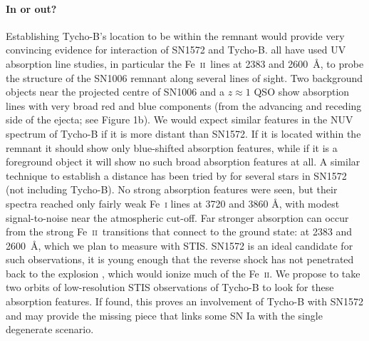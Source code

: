 \documentclass[12pt]{article}
\newcommand{\feii}{Fe~\textsc{ii}}
\begin{document}
\paragraph{In or out?}
Establishing Tycho-B's location to be within the remnant would provide very convincing evidence for interaction of SN1572 and Tycho-B. 
\cite{1988ApJ...327..164F,1993ApJ...416..247W, 2005ApJ...624..189W} all have used UV absorption line studies, in particular the \feii\ lines at 2383 and 2600~\AA, to probe the structure of the SN1006 remnant along several lines of sight. Two background objects near the projected centre of SN1006 \citep[an OB subdwarf; ][]{1980ApJ...241.1039S} and a $z \approx 1$ QSO show absorption lines with very broad red and blue components (from the advancing and receding side of the ejecta; see Figure 1b).  We would expect similar features in the NUV spectrum of Tycho-B if it is more distant than SN1572.   If it is located  within the remnant it should  show only blue-shifted absorption features, while if it is a foreground object it will show no such broad absorption features at all. A similar technique to establish a distance has been tried by \citet{2007PASJ...59..811I} for  several stars in SN1572 (not including Tycho-B).  No strong absorption features were seen, but their spectra reached only fairly weak Fe~\textsc{i} lines at 3720 and 3860 \AA, with modest signal-to-noise near the atmospheric cut-off.
Far stronger absorption can occur  from the strong \feii\ transitions that connect to the ground state: at 2383 and 2600~\AA, which we plan to measure with STIS. SN1572 is an ideal candidate for such observations, it is young enough that the reverse shock has not penetrated back to the explosion \citep[current radius 183\arcsec;][]{2005ApJ...634..376W}, which would  ionize much of the \feii. We propose to take two orbits of low-resolution STIS observations of Tycho-B to look for these absorption features. If found,  this proves an involvement of Tycho-B with SN1572 and may provide the missing piece that links some SN Ia with the single degenerate scenario.
\end{document}
